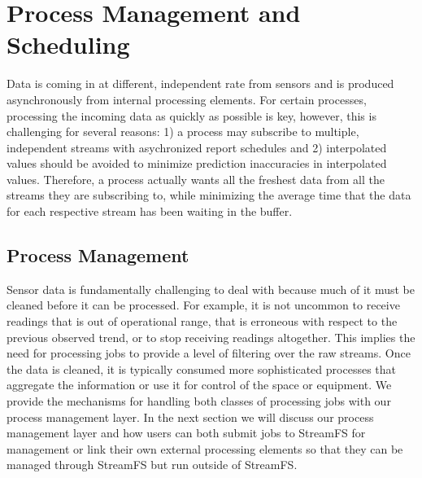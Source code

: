 


\chapter{Process Management and Scheduling}
Data is coming in at different, independent rate from sensors and is produced asynchronously from internal processing elements.
For certain processes, processing the incoming data as quickly as possible is key, however, this is challenging for several reasons:
1) a process may subscribe to multiple, independent streams with asychronized report schedules and 2) interpolated values
should be avoided to minimize prediction inaccuracies in interpolated values.  Therefore, a process actually wants all the freshest
data from all the streams they are subscribing to, while minimizing the average time that the data for each respective stream has 
been waiting in the buffer.

\section{Process Management}
%
Sensor data is fundamentally challenging to deal with because much of it must be cleaned before it can be processed.  For example,
it is not uncommon to receive readings that is out of operational range, that is erroneous with respect to the previous observed trend,
or to stop receiving readings altogether.  This implies the need for processing jobs to provide a level of filtering over the raw streams.
Once the data is cleaned, it is typically consumed more sophisticated processes that aggregate the information or use it for control
of the space or equipment.  We provide the mechanisms for handling both classes of processing jobs with our process management layer.
In the next section we will discuss our process management layer and how users can both submit jobs to StreamFS for management or link
their own external processing elements so that they can be managed through StreamFS but run outside of StreamFS.



